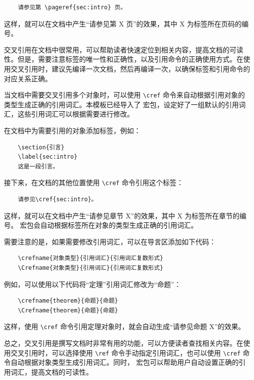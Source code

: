 \begin{Verbatim}
    请参见第 \pageref{sec:intro} 页。
\end{Verbatim}

这样，就可以在文档中产生“请参见第 X 页”的效果，其中 X 为标签所在页码的编号。

交叉引用在文档中很常用，可以帮助读者快速定位到相关内容，提高文档的可读性。但是，需要注意标签的唯一性和正确性，以及引用命令的正确使用方式。在使用交叉引用时，建议先编译一次文档，然后再编译一次，以确保标签和引用命令的对应关系正确。

当文档中需要交叉引用多个对象时，可以使用 \verb|\cref| 命令来自动根据引用对象的类型生成正确的引用词汇。本模板已经导入了  宏包，设定好了一组默认的引用词汇，这些引用词汇可以根据需要进行修改。

在文档中为需要引用的对象添加标签，例如：

\begin{Verbatim}
    \section{引言}
    \label{sec:intro}
    这是一段引言。
\end{Verbatim}

接下来，在文档的其他位置使用 \verb|\cref| 命令引用这个标签：

\begin{Verbatim}
    请参见\cref{sec:intro}。
\end{Verbatim}

这样，就可以在文档中产生“请参见章节 X”的效果，其中 X 为标签所在章节的编号。 宏包会自动根据标签所在对象的类型生成正确的引用词汇。

需要注意的是，如果需要修改引用词汇，可以在导言区添加如下代码：

\begin{Verbatim}
    \crefname{对象类型}{引用词汇}{引用词汇复数形式}
    \Crefname{对象类型}{引用词汇}{引用词汇复数形式}
\end{Verbatim}

例如，可以使用以下代码将“定理”引用词汇修改为“命题”：

\begin{Verbatim}
    \crefname{theorem}{命题}{命题}
    \Crefname{theorem}{命题}{命题}
\end{Verbatim}

这样，使用 \verb|\cref| 命令引用定理对象时，就会自动生成“请参见命题 X”的效果。

总之，交叉引用是撰写文档时非常有用的功能，可以方便读者查找相关内容。在使用交叉引用时，可以选择使用 \verb|\ref| 命令手动指定引用词汇，也可以使用 \verb|\cref| 命令自动根据对象类型生成引用词汇。同时， 宏包可以帮助用户自动设置正确的引用词汇，提高文档的可读性。